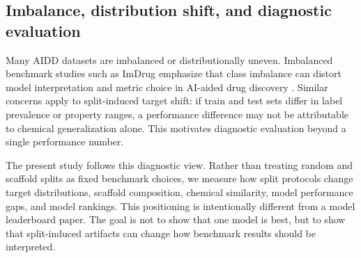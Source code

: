 \subsection{Imbalance, distribution shift, and diagnostic evaluation}

Many AIDD datasets are imbalanced or distributionally uneven. Imbalanced benchmark studies such as ImDrug emphasize that class imbalance can distort model interpretation and metric choice in AI-aided drug discovery \citep{li2022imdrug}. Similar concerns apply to split-induced target shift: if train and test sets differ in label prevalence or property ranges, a performance difference may not be attributable to chemical generalization alone. This motivates diagnostic evaluation beyond a single performance number.

The present study follows this diagnostic view. Rather than treating random and scaffold splits as fixed benchmark choices, we measure how split protocols change target distributions, scaffold composition, chemical similarity, model performance gaps, and model rankings. This positioning is intentionally different from a model leaderboard paper. The goal is not to show that one model is best, but to show that split-induced artifacts can change how benchmark results should be interpreted.
